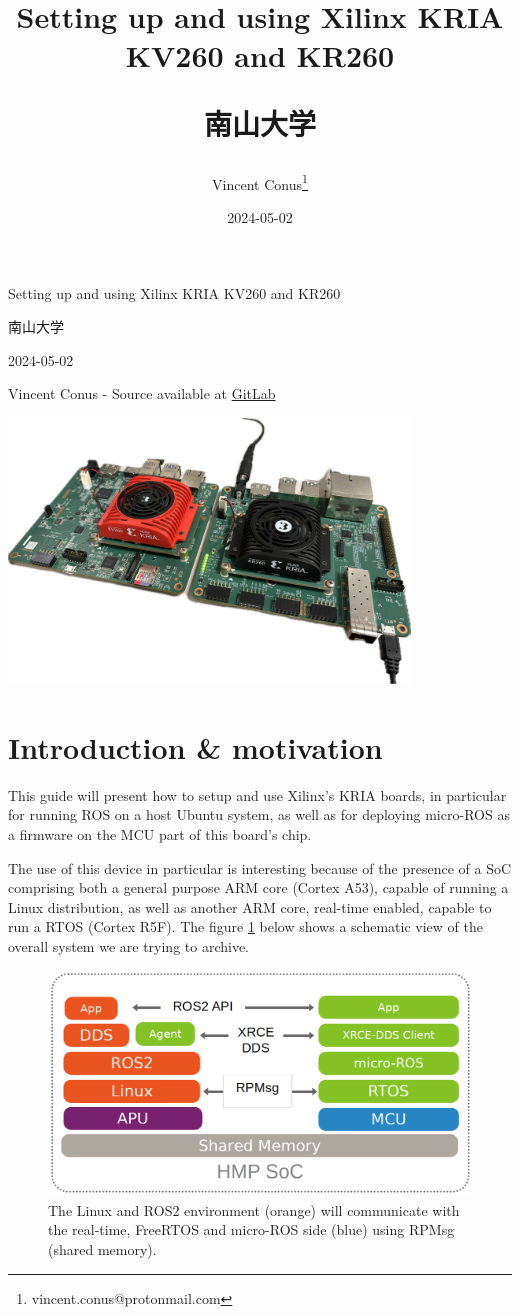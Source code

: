 \documentclass[10pt]{article}
\author{Vincent Conus\thanks{vincent.conus@protonmail.com}}
\date{2024-05-02}
\title{Setting up and using Xilinx KRIA KV260 and KR260\\\medskip
\large \begin{CJK}{UTF8}{min}南山大学\end{CJK}}
\newcommand{\gitlab}[1]{%
\href{#1}{GitLab \faGitlab}}
\begin{document}
\begin{titlepage}
\centering
{\LARGE Setting up and using Xilinx KRIA KV260 and KR260 \par }
\vspace{5mm}
{\large \begin{CJK}{UTF8}{min}南山大学\end{CJK} \par}
\vspace{1cm}
{\large 2024-05-02 \par}
\vspace{2cm}
{\large Vincent Conus -  Source available at \gitlab{https://gitlab.com/sunoc/xilinx-kria-kv260-documentation} \par}
\vspace{3cm}
\includegraphics[width=0.8\textwidth]{./img/boards}\end{titlepage}
\tableofcontents
\pagebreak
\section{Introduction \& motivation}
\label{sec:org8f752bb}
This guide will present how to setup and use Xilinx's KRIA boards, in particular
for running ROS on a host Ubuntu system, as well as for deploying
micro-ROS\cite{Belsare2023} as a firmware on the MCU part of this board's chip.

The use of this device in particular is interesting because of the presence of a
SoC comprising both a general purpose ARM core (Cortex A53), capable of running a Linux
distribution, as well as another ARM core, real-time enabled, capable to run a
RTOS (Cortex R5F). The figure \ref{fig:org73e175c} below shows a schematic view of the overall system we
are trying to archive.

\begin{figure}[htbp]
\centering
\includegraphics[width=.6\textwidth]{img/map.png}
\caption{\label{fig:org73e175c}The Linux and ROS2 environment (orange) will communicate with the real-time, FreeRTOS and micro-ROS side (blue) using RPMsg (shared memory).}
\end{figure}
\end{document}
